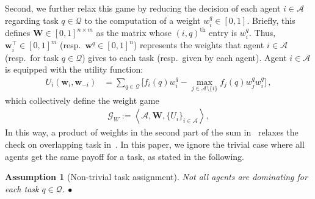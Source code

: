 \documentclass{IEEEtran}
\newcommand{\ldef}{:=}
\newcommand{\Mcal}[1]{\mathcal{#1}}
\newcommand{\Mc}[1]{\mathcal{#1}}
\newcommand{\tth}{^{\text{th}}}
\newcommand{\bld}[1]{\mathbf{#1}}
\newcommand{\thmtitle}[1]{\mbox{}\emph{(#1).}}
\newtheorem{assume}[theorem]{Assumption}
\newcommand{\bulletsym}{\hbox{$\bullet$}}
\newcommand{\bulletend}{\relax\ifmmode\else\unskip\hfill\fi\bulletsym}
\newcommand{\marginn}[1]{\marginpar{\color{blue}\tiny\ttfamily#1}}
\newcommand{\margin}[1]{\marginpar{\color{magenta}\tiny\ttfamily#1}}
\def \agt{\Mcal{A}}
\def \game{\mathscr{G}}
\def \tsk{\Mc{Q}}
\def \w{\bld{w}}
\def \W{\bld{W}}
\begin{document}
Second, we further relax this game by reducing the decision of each
agent $i \in \agt$ regarding task $q \in \tsk$ to the computation of a
weight $w^q_i \in [0,1]$.  Briefly, this defines
$\W \in [0,1]^{n \times m}$ as the matrix whose $(i,q)\tth$ entry is
$w^q_i$.
Thus, 
$\w_i^\top \in [0,1]^m$ (resp.~$\w^q \in [0,1]^n$) %
represents the weights that agent $i \in \agt$ (resp.~for task
$q \in \tsk$) gives to each task (resp.~given by each agent).
%
%
Agent $i \in \agt$ is equipped with the
utility function:
\begin{align}
	U_i(\w_i,\w_{-i}) & = \sum_{q \in \tsk} \Big[ f_i(q)w^q_i - \max_{j \in \agt \setminus \{i\}} f_j(q)w^q_j w^q_i \Big] \,,
	\label{eq:agent_reward_max} 
\end{align}
which collectively define the weight game
\begin{align*}
	\game_W \ldef {\left<\agt,%
	\W,\{U_i\}_{i \in \agt} \right>},
\end{align*}
In this way, a product of
weights in the second part of the sum in~
relaxes the check on overlapping task in~. 
In this paper, we ignore the trivial
case where all agents get the same payoff for a task, as stated in the
following.

\begin{assume}[Non-trivial task assignment]\label{asmp:not_all_dominating}
  Not all agents are dominating for each task $q \in \tsk$.
  \bulletend
\end{assume}
\end{document}
